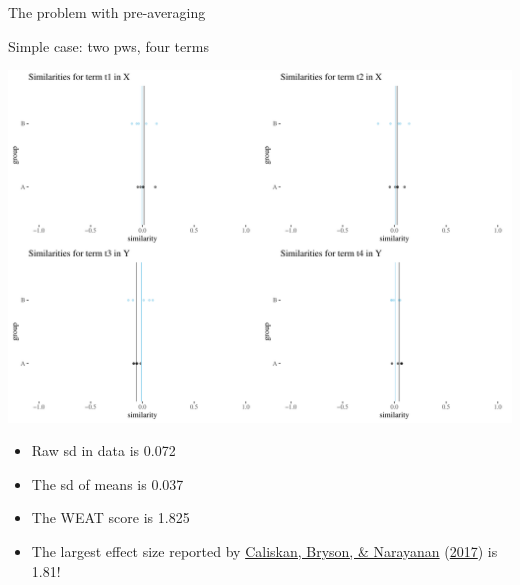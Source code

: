 \documentclass[
  10pt,
  ignorenonframetext,
  x11names, dvipsnames, bibspacing,natbib, table]{beamer}
\providecommand{\tightlist}{%
  \setlength{\itemsep}{0pt}\setlength{\parskip}{0pt}}
\begin{document}
\begin{frame}{The problem with pre-averaging}
\protect\hypertarget{the-problem-with-pre-averaging-1}{}
\begin{block}{Simple case: two pws, four terms}
\protect\hypertarget{simple-case-two-pws-four-terms}{}
\vspace{1mm}
\footnotesize

\begin{center}\includegraphics[width=0.7\linewidth]{presentationBoston_files/figure-beamer/unnamed-chunk-6-1} \end{center}
\normalsize

\vspace{1mm}
\footnotesize

\normalsize
\pause

\footnotesize

\vspace{-2mm}

\begin{itemize}
\tightlist
\item
  Raw sd in data is 0.072
\item
  The sd of means is 0.037
\item
  The WEAT score is 1.825\\
\item
  The largest effect size reported by
  \protect\hyperlink{ref-Caliskan2017semanticsBiases}{Caliskan, Bryson,
  \& Narayanan}
  (\protect\hyperlink{ref-Caliskan2017semanticsBiases}{2017}) is 1.81!
\end{itemize}
\end{block}
\end{frame}
\end{document}
